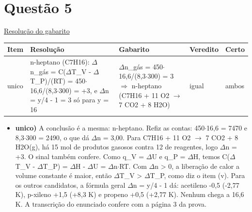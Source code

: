 \documentclass{article}%
\begin{document}
\section*{Questão 5}%
\href{https://poliedroresolve.sistemapoliedro.com.br/vestibulares/ime/2027/ime-2-fase-dia-3-28-10-2026-2-fase-dia-3/dissertativa-5-quimica-2-fase-dia-3-ime-2027}{Resolução do gabarito}\par\smallskip%
\begin{longtable}{@{}p{} p{} p{} p{} p{}@{}}\toprule Item & Resolução & Gabarito & Veredito & Certo \\ \midrule
unico & n{-}heptano (C7H16): $\Delta$n\_gás = C($\Delta$T\_V - $\Delta$T\_P)/(RT) = 450$\cdot$16,6/(8,3$\cdot$300) = +3, e $\Delta$n = y/4 - 1 = 3 só para y = 16 & $\Delta$n\_gás = 450$\cdot$16,6/(8,3$\cdot$300) = 3 $\Rightarrow$ n{-}heptano (C7H16 + 11 O2 $\to$ 7 CO2 + 8 H2O) & igual & ambos \\
\bottomrule\end{longtable}%
\begin{itemize}%
\item%
\textbf{unico)} A conclusão é a mesma: n{-}heptano. Refiz as contas: 450$\cdot$16,6 = 7470 e 8,3$\cdot$300 = 2490, o que dá $\Delta$n = 3,00. Para C7H16 + 11 O2 $\to$ 7 CO2 + 8 H2O(g), há 15 mol de produtos gasosos contra 12 de reagentes, logo $\Delta$n = +3. O sinal também confere. Como q\_V = $\Delta$U e q\_P = $\Delta$H, temos C($\Delta$T\_V - $\Delta$T\_P) = $\Delta$H - $\Delta$U = $\Delta$n$\cdot$RT. Com $\Delta$n > 0, a liberação de calor a volume constante é maior, então $\Delta$T\_V > $\Delta$T\_P, como diz o item (v). Para os outros candidatos, a fórmula geral $\Delta$n = y/4 - 1 dá: acetileno -0,5 (-2,77 K), p{-}xileno +1,5 (+8,3 K) e propeno +0,5 (+2,77 K). Nenhum chega a 16,6 K. A transcrição do enunciado confere com a página 3 da prova.%
\end{itemize}%
\end{document}
